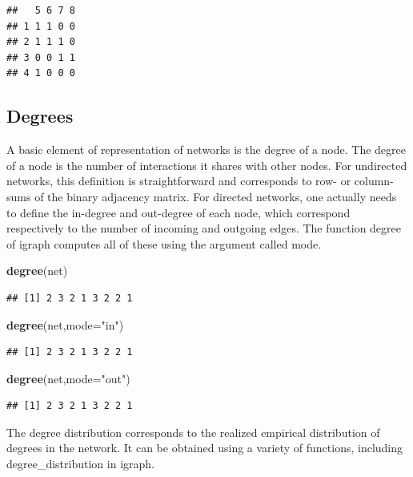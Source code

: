 \documentclass[
]{book}
\newenvironment{Shaded}{\begin{snugshade}}{\end{snugshade}}
\newcommand{\AttributeTok}[1]{\textcolor[rgb]{0.13,0.29,0.53}{#1}}
\newcommand{\FunctionTok}[1]{\textcolor[rgb]{0.13,0.29,0.53}{\textbf{#1}}}
\newcommand{\NormalTok}[1]{#1}
\newcommand{\StringTok}[1]{\textcolor[rgb]{0.31,0.60,0.02}{#1}}
\theoremstyle{definition}
\theoremstyle{definition}
\theoremstyle{definition}
\theoremstyle{definition}
\theoremstyle{remark}
\begin{document}
\begin{verbatim}
##   5 6 7 8
## 1 1 1 0 0
## 2 1 1 1 0
## 3 0 0 1 1
## 4 1 0 0 0
\end{verbatim}

\subsection{Degrees}\label{degrees}

A basic element of representation of networks is the degree of a node.
The degree of a node is the number of interactions it shares with other nodes.
For undirected networks, this definition is straightforward and corresponds to row- or column-sums of the binary adjacency matrix.
For directed networks, one actually needs to define the in-degree and out-degree of each node, which correspond respectively to the number of incoming and outgoing edges.
The function degree of igraph computes all of these using the argument called mode.

\begin{Shaded}
\begin{Highlighting}[]
\FunctionTok{degree}\NormalTok{(net)}
\end{Highlighting}
\end{Shaded}

\begin{verbatim}
## [1] 2 3 2 1 3 2 2 1
\end{verbatim}

\begin{Shaded}
\begin{Highlighting}[]
\FunctionTok{degree}\NormalTok{(net,}\AttributeTok{mode=}\StringTok{"in"}\NormalTok{)}
\end{Highlighting}
\end{Shaded}

\begin{verbatim}
## [1] 2 3 2 1 3 2 2 1
\end{verbatim}

\begin{Shaded}
\begin{Highlighting}[]
\FunctionTok{degree}\NormalTok{(net,}\AttributeTok{mode=}\StringTok{"out"}\NormalTok{)}
\end{Highlighting}
\end{Shaded}

\begin{verbatim}
## [1] 2 3 2 1 3 2 2 1
\end{verbatim}

The degree distribution corresponds to the realized empirical distribution of degrees in the network. It can be obtained using a variety of functions, including degree\_distribution in igraph.
\end{document}
